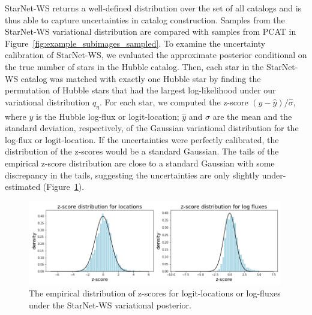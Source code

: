StarNet-WS returns a well-defined distribution over the set of all catalogs
and is thus able to capture uncertainties in catalog construction. 
Samples from the StarNet-WS variational distribution are compared with samples from PCAT in Figure~\ref{fig:example_subimages_sampled}. 
To examine the uncertainty calibration of StarNet-WS, we evaluated the approximate posterior 
conditional on the true number of stars in the Hubble catalog. 
Then, each star in the StarNet-WS catalog was matched with exactly one Hubble star by finding the permutation of Hubble stars that had the largest log-likelihood under our variational distribution $q_\eta$. 
For each star, we computed the z-score $(y - \hat y) / \hat \sigma$, where $y$ is the Hubble log-flux or 
logit-location; $\hat y$ and $\hat\sigma$ are the mean and the standard deviation, respectively, of the Gaussian variational distribution for the log-flux or logit-location.
If the uncertainties were perfectly calibrated, the distribution of the z-scores would be a standard Gaussian. 
The tails of the empirical z-score distribution are close to a standard Gaussian with some discrepancy in the tails, suggesting the uncertainties are only slightly under-estimated (Figure~\ref{fig:z-score_calibration}). 

\begin{figure}[ht]
    \centering
    \includegraphics[width=0.99\textwidth]{figures/z-score_calibration.png}
    \caption{The empirical distribution of z-scores for logit-locations or log-fluxes under the StarNet-WS variational posterior. 
}
    \label{fig:z-score_calibration}
\end{figure}


